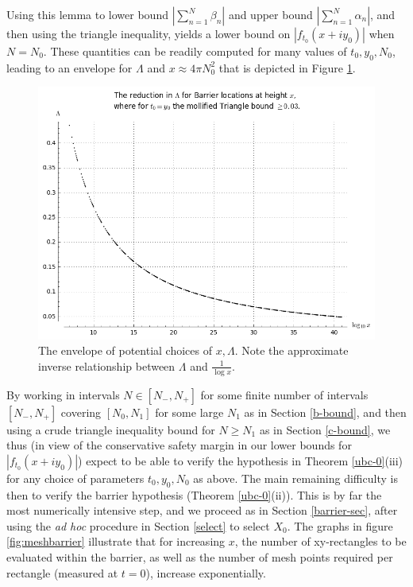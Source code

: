 Using this lemma to lower bound $|\sum_{n=1}^N \beta_n|$ and upper bound $|\sum_{n=1}^N \alpha_n|$, and then using the triangle inequality, yields a lower bound on $|f_{t_0}(x+iy_0)|$ when $N=N_0$.  These quantities can be readily computed for many values of $t_0,y_0,N_0$, leading to an envelope for $\Lambda$ and $x \approx 4 \pi N_0^2$ that is depicted in Figure \ref{tradeoff}.

\begin{figure}[!ht]
  \includegraphics[width=1.0\linewidth]{tradeoff.png}
  \caption{The envelope of potential choices of $x, \Lambda$.  Note the approximate inverse relationship between $\Lambda$ and $\frac{1}{\log x}$.}
  \label{tradeoff}
\end{figure}

By working in intervals $N \in [N_-,N_+]$ for some finite number of intervals $[N_-,N_+]$ covering $[N_0,N_1]$ for some large $N_1$ as in Section \ref{b-bound}, and then using a crude triangle inequality bound for $N \geq N_1$ as in Section \ref{c-bound}, we thus (in view of the conservative safety margin in our lower bounds for $|f_{t_0}(x+iy_0)|$) expect to be able to verify the hypothesis in Theorem \ref{ubc-0}(iii) for any choice of parameters $t_0, y_0, N_0$ as above.  The main remaining difficulty is then to verify the barrier hypothesis (Theorem \ref{ubc-0}(ii)).  This is by far the most numerically intensive step, and we proceed as in Section \ref{barrier-sec}, after using the \emph{ad hoc} procedure in Section \ref{select} to select $X_0$.   The graphs in figure \ref{fig:meshbarrier} illustrate that for increasing $x$, the number of xy-rectangles to be evaluated within the barrier, as well as the number of mesh points required per rectangle (measured at $t=0$), increase exponentially. 

